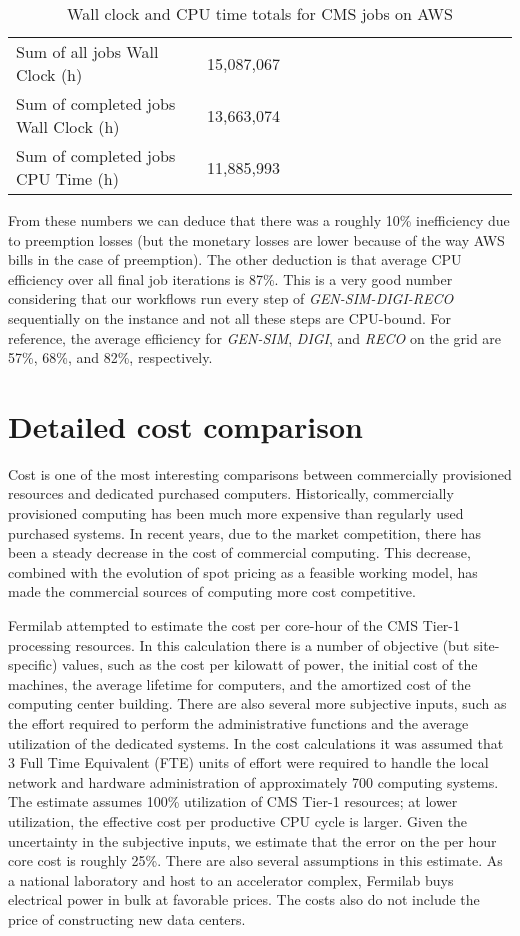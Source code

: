 \documentclass[twocolumn]{svjour3}          %
\begin{document}
\begin{table}
\caption{Wall clock and CPU time totals for CMS jobs on AWS}
\label{aws:times}
\begin{tabular*}{.5\textwidth}{@{}l*{15}{@{}l}}
\\
Sum of all jobs Wall Clock (h) & 15,087,067 \\
Sum of completed jobs Wall Clock (h) & 13,663,074 \\
Sum of completed jobs CPU Time (h) & 11,885,993 \\
\hline
\end{tabular*}
\end{table}
From these numbers we can deduce that there was a roughly 10\% inefficiency due to preemption losses (but the monetary losses are lower because of the way AWS bills in the case of preemption). The other deduction is that average CPU efficiency over all final job iterations is 87\%. This is a very good number considering that our workflows run every step of {\it GEN-SIM-DIGI-RECO} sequentially on the instance and not all these steps are CPU-bound. For reference, the average efficiency for {\it GEN-SIM}, {\it DIGI}, and {\it RECO} on the grid are 57\%, 68\%, and 82\%, respectively. %

\section{Detailed cost comparison}

Cost is one of the most interesting comparisons between commercially provisioned resources and dedicated purchased computers. Historically, commercially provisioned computing has been much more expensive than regularly used purchased systems.  In recent years, due to the market competition, there has been a steady decrease in the cost of commercial computing. This decrease, combined with the evolution of spot pricing as a feasible working model, has made the commercial sources of computing more cost competitive.

Fermilab attempted to estimate the cost per core-hour of the CMS Tier-1 processing resources.
In this calculation there is a number of objective (but site-specific) values, such as the cost per kilowatt of power, the initial cost of the machines, the average lifetime for computers, and the amortized cost of the computing center building. There are also several more subjective inputs, such as the effort required to perform the administrative functions and the average utilization of the dedicated systems. In the cost calculations it was assumed that 3 Full Time Equivalent (FTE) units of effort were required to handle the local network and hardware administration of approximately 700 computing systems.
The estimate assumes 100\% utilization of CMS  Tier-1 resources; at lower utilization, the effective cost per productive CPU cycle is larger.
Given the uncertainty in the subjective inputs, we estimate that the error on the per hour core cost is roughly 25\%. There are also several assumptions in this
estimate. As a national laboratory and host to an accelerator complex, Fermilab buys electrical power in bulk at favorable prices. The costs also do not
include the price of constructing new data centers.
\end{document}
